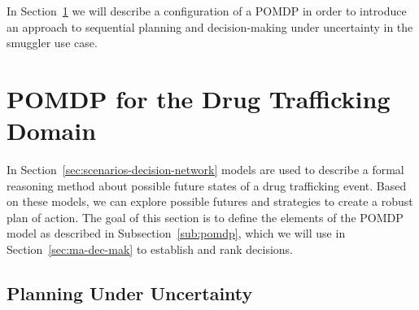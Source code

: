 \documentclass[conference]{IEEEtran}
\begin{document}
In Section~\ref{sec:scenario-based-dm} we will describe a configuration of a POMDP in order to introduce an approach to sequential planning and decision-making under uncertainty in the smuggler use case. 




\section{POMDP for the Drug Trafficking Domain}
\label{sec:scenario-based-dm}

In Section~\ref{sec:scenarios-decision-network} models are used to describe a formal reasoning method about possible future states of a drug trafficking event. Based on these models, we can explore possible futures and strategies to create a robust plan of action. The goal of this section is to define the elements of the POMDP model as described in Subsection~\ref{sub:pomdp}, which we will use in Section~\ref{sec:ma-dec-mak} to establish and rank decisions.

\subsection{Planning Under Uncertainty}
\label{sub:plan-uncert}

\end{document}
